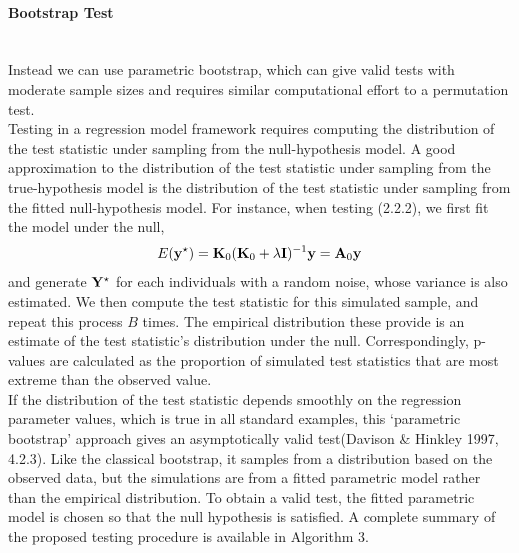 \documentclass[11pt]{article}
\begin{document}
\paragraph{Bootstrap Test}\mbox{}\\
Instead we can use parametric bootstrap, which can give valid tests with moderate sample sizes and requires similar computational effort to a permutation test.\\
Testing in a regression model framework requires computing the distribution of the test statistic under sampling from the null-hypothesis model. A good approximation to the distribution of the test statistic under sampling from the true-hypothesis model is the distribution of the test statistic under sampling from the fitted null-hypothesis model. For instance, when testing (2.2.2), we first fit the model under the null,
\begin{align}
E({\bf y}^\star)={\bf K}_0({\bf K}_0+\lambda {\bf I})^{-1}{\bf y}={\bf A}_0{\bf y}
\end{align}
and generate ${\bf Y}^\star$ for each individuals with a random noise, whose variance is also estimated. We then compute the test statistic for this simulated sample, and repeat this process $B$ times. The empirical distribution these provide is an estimate of the test statistic's distribution under the null. Correspondingly, p-values are calculated as the proportion of simulated test statistics that are most extreme than the observed value.\\
If the distribution of the test statistic depends smoothly on the regression parameter values, which is true in all standard examples, this ‘parametric bootstrap’ approach gives an asymptotically valid test(Davison \& Hinkley 1997, 4.2.3). Like the classical bootstrap, it samples from a distribution based on the observed data, but the simulations are from a fitted parametric model rather than the empirical distribution. To obtain a valid test, the fitted parametric model is chosen so that the null hypothesis is satisfied.
A complete summary of the proposed testing procedure is available in Algorithm 3.\\
\end{document}

